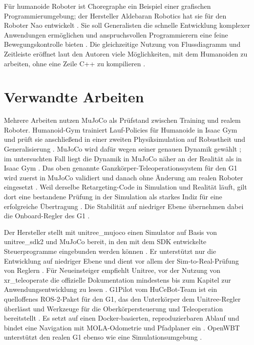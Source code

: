 Für humanoide Roboter ist Choregraphe ein Beispiel einer grafischen Programmierumgebung; der Hersteller Aldebaran Robotics hat sie für den Roboter Nao entwickelt \cite{Pot2009}.
Sie soll Generalisten die schnelle Entwicklung komplexer Anwendungen ermöglichen und anspruchsvollen Programmierern eine feine Bewegungskontrolle bieten \cite{Pot2009}.
Die gleichzeitige Nutzung von Flussdiagramm und Zeitleiste eröffnet laut den Autoren viele Möglichkeiten, mit dem Humanoiden zu arbeiten, ohne eine Zeile C++ zu kompilieren \cite{Pot2009}.

\section{Verwandte Arbeiten}
\label{sec:verwandte_arbeiten}
Mehrere Arbeiten nutzen MuJoCo als Prüfstand zwischen Training und realem Roboter.
Humanoid-Gym trainiert Lauf-Policies für Humanoide in Isaac Gym \cite{Gu2024} und prüft sie anschließend in einer zweiten Physiksimulation auf Robustheit und Generalisierung \cite{Gu2024}.
MuJoCo wird dafür wegen seiner genauen Dynamik gewählt \cite{Gu2024}; im untersuchten Fall liegt die Dynamik in MuJoCo näher an der Realität als in Isaac Gym \cite{Gu2024}.
Das oben genannte Ganzkörper-Teleoperationssystem für den G1 wird zuerst in MuJoCo validiert und danach ohne Änderung am realen Roboter eingesetzt \cite{Durrani2026}.
Weil derselbe Retargeting-Code in Simulation und Realität läuft, gilt dort eine bestandene Prüfung in der Simulation als starkes Indiz für eine erfolgreiche Übertragung \cite{Durrani2026}.
Die Stabilität auf niedriger Ebene übernehmen dabei die Onboard-Regler des G1 \cite{Durrani2026}.

Der Hersteller stellt mit unitree\_mujoco einen Simulator auf Basis von unitree\_sdk2 und MuJoCo bereit, in den mit dem SDK entwickelte Steuerprogramme eingebunden werden können \cite{UnitreeMujoco}.
Er unterstützt nur die Entwicklung auf niedriger Ebene und dient vor allem der Sim-to-Real-Prüfung von Reglern \cite{UnitreeMujoco}.
Für Neueinsteiger empfiehlt Unitree, vor der Nutzung von xr\_teleoperate die offizielle Dokumentation mindestens bis zum Kapitel zur Anwendungsentwicklung zu lesen \cite{UnitreeXRTeleop}.
G1Pilot vom HuCeBot-Team ist ein quelloffenes ROS-2-Paket für den G1, das den Unterkörper dem Unitree-Regler überlässt und Werkzeuge für die Oberkörpersteuerung und Teleoperation bereitstellt \cite{HucebotG1Pilot}.
Es setzt auf einen Docker-basierten, reproduzierbaren Ablauf \cite{HucebotG1Pilot} und bindet eine Navigation mit MOLA-Odometrie und Pfadplaner ein \cite{HucebotG1Pilot}.
OpenWBT unterstützt den realen G1 ebenso wie eine Simulationsumgebung \cite{GalbotOpenWBT}.

